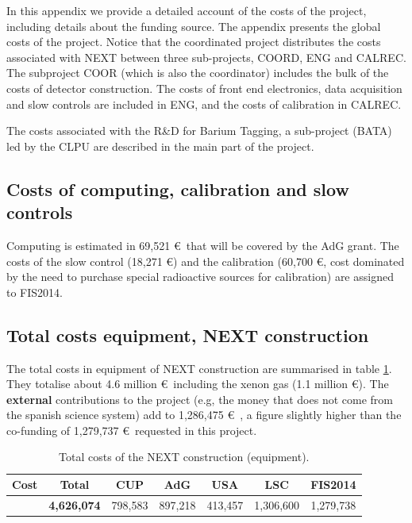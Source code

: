 \documentclass[a4paper,11pt,oneside]{article}
\begin{document}
In this appendix we provide a detailed account of the costs of the project, including details about the funding source. The appendix presents the global costs of the project. Notice that the coordinated project distributes the costs associated with NEXT between three sub-projects, COORD, ENG and CALREC. The subproject COOR (which is also the coordinator) includes the bulk of  the costs of detector construction. The costs of front end electronics, data acquisition and slow controls are included in ENG, and the costs of calibration in CALREC. 

The costs associated with the R\&D for Barium Tagging, a sub-project (BATA) led by the CLPU are described in the main part of the project. 





\subsection{Costs of computing, calibration and slow controls}
Computing is estimated in 69,521 \euro\ that will be covered by the AdG grant. The costs of the slow control (18,271 \euro) and the calibration (60,700 \euro, cost dominated by the need to purchase special radioactive sources for calibration) are assigned to FIS2014. 

\subsection{Total costs equipment, NEXT construction}
The total costs in equipment of NEXT construction are summarised in table  \ref{tab.TotalE}. They totalise about 4.6 million \euro\ including the xenon gas (1.1 million \euro). The {\bf external} contributions to the project (e.g, the money that does not come from the spanish science system)
add to 1,286,475 \euro\ ,  a figure slightly higher than the co-funding of 1,279,737  \euro\ 
requested in this project. 

\begin{table}[h!]
\begin{center}
\begin{tabular}{|l|c|c|c|c|c|c|}
\hline
Cost	& Total &	CUP &	AdG	& USA &	LSC &	FIS2014 \\
 \hline
& {\bf 4,626,074} &	798,583 & 	897,218 & 	413,457&	1,306,600 & 1,279,738 \\	
 \hline\hline
\end{tabular}  
\caption{Total costs of the NEXT construction (equipment).}
\label{tab.TotalE}
\end{center}
\end{table} 
\end{document}
